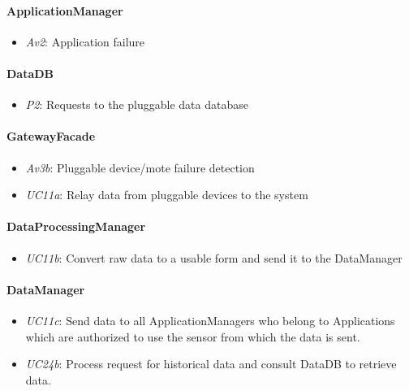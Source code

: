 \documentclass[english]{sareport}
\begin{document}
\paragraph{ApplicationManager}
\begin{itemize}
	\item \emph{Av2}: Application failure
\end{itemize}

\paragraph{DataDB}
\begin{itemize}
	\item \emph{P2}: Requests to the pluggable data database
\end{itemize}

\paragraph{GatewayFacade}
\begin{itemize}
	\item \emph{Av3b}: Pluggable device/mote failure detection
	\item \emph{UC11a}: Relay data from pluggable devices to the system
\end{itemize}

\paragraph{DataProcessingManager}
\begin{itemize}
	\item \emph{UC11b}: Convert raw data to a usable form and send it to the DataManager
\end{itemize}

\paragraph{DataManager}
\begin{itemize}
	\item \emph{UC11c}: Send data to all ApplicationManagers who belong to Applications which are authorized to use the sensor from which the data is sent.
	\item \emph{UC24b}: Process request for historical data and consult DataDB to retrieve data.
\end{itemize}
\end{document}
